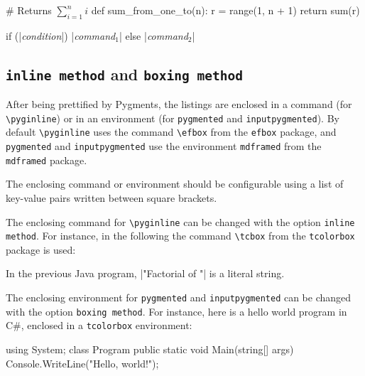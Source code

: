 \documentclass[10pt,a4paper]{article}
\begin{document}
\begin{Example}
\begin{pygmented}[lang=python,mathescape]
# Returns $\sum_{i=1}^{n}i$
def sum_from_one_to(n):
    r = range(1, n + 1)
    return sum(r)
\end{pygmented}
\end{Example}

\begin{Example}
\begin{pygmented}[lang=c,escapeinside=||]

if (|\textit{condition}|)
    |\textit{command$_1$}|
else
    |\textit{command$_2$}|
\end{pygmented}
\end{Example}


\subsection{\texttt{inline method} and \texttt{boxing method}}

After being prettified by Pygments, the listings are enclosed in a
command (for \verb|\pyginline|) or in an environment (for
\verb|pygmented| and \verb|inputpygmented|). By default
\verb|\pyginline| uses the command \verb|\efbox| from the \texttt{efbox}
package, and \verb|pygmented| and \verb|inputpygmented| use the
environment \verb|mdframed| from the \texttt{mdframed} package.

The enclosing command or environment should be configurable using a list
of key-value pairs written between square brackets.

The enclosing command for
\verb|\pyginline| can be changed with the option
\verb|inline method|. For instance, in the following the command
\verb|\tcbox| from the \verb|tcolorbox| package is used:

\begin{Example}
  In the previous Java program,
  \pyginline[lang=java,inline method=tcbox]|"Factorial of "| is a
  literal string.
\end{Example}

The enclosing environment for \verb|pygmented| and
\verb|inputpygmented| can be changed with the option
\verb|boxing method|. For instance, here is a hello world program in
C\#, enclosed in a \verb|tcolorbox| environment:

\begin{Example}
\begin{pygmented}[lang=csharp,boxing method=tcolorbox]
using System;
class Program
{
    public static void Main(string[] args)
    {
        Console.WriteLine("Hello, world!");
    }
}
\end{pygmented}
\end{Example}
\end{document}

